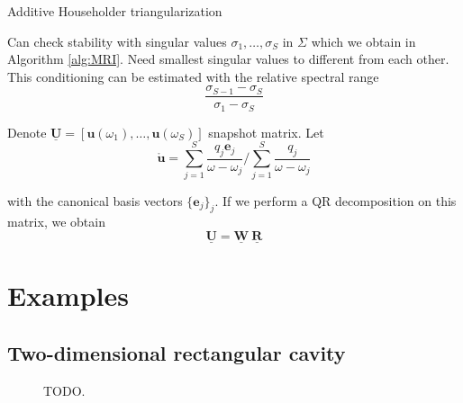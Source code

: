 \documentclass[11pt, a4paper]{article}
\begin{document}


\citep{householder}

\begin{algorithm}
    \caption{Additive Householder triangularization} \label{alg:householder}
    
\end{algorithm}

Can check stability with singular values $\sigma_1, \dots, \sigma_S$ in 
$\Sigma$ which we obtain in Algorithm \ref{alg:MRI}. Need smallest singular values
to different from each other. This conditioning can be estimated with the relative
spectral range %
\begin{equation}
    \frac{\sigma_{S-1} - \sigma_S}{\sigma_1 - \sigma_S}
\end{equation}

Denote $\mathbf{\underline{U}} = [\mathbf{u}(\omega_1), \dots, \mathbf{u}(\omega_S)]$
snapshot matrix.
Let 
\begin{equation}
    \mathbf{\mathring{u}} = \sum_{j=1}^S \frac{q_j \mathbf{e}_j}{\omega - \omega_j}
    / \sum_{j=1}^S \frac{q_j}{\omega - \omega_j}
\end{equation}


with the canonical basis vectors $\{ \mathbf{e}_j \}_j$.
If we perform a QR decomposition on this matrix, we obtain 
\begin{equation}
    \mathbf{\underline{U}} = \mathbf{\underline{W}} ~ \mathbf{\underline{R}}
\end{equation}


\pagebreak
\section{Examples}
\label{sec:examples}

\subsection{Two-dimensional rectangular cavity}
\label{subsec:examples-rectangularcavity}

\begin{figure}[h]
    \centering
    
    \caption{TODO.}
    \label{fig:rectangular_cavity}
\end{figure}
\end{document}
